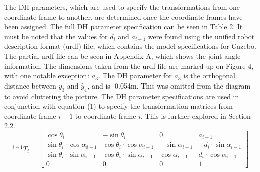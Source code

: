 \documentclass[a4paper]{article}
\begin{document}
The DH parameters, which are used to specify the transformations from one coordinate frame to another, are determined once the coordinate frames have been assigned. The full DH parameter specification can be seen in Table 2. It must be noted that the values for $d_i$ and $a_{i-1}$ were found using the unified robot description format (urdf) file, which contains the model specifications for Gazebo. The partial urdf file can be seen in Appendix A, which shows the joint angle information. The dimensions taken from the urdf file are marked up on Figure 4, with one notable exception: $a_3$. The DH parameter for $a_3$ is the orthogonal distance between $\hat{y}_3$ and $\hat{y}_4$, and is -0.054$\si{\meter}$. This was omitted from the diagram to avoid cluttering the picture. The DH parameter specifications are used in conjunction with equation (1) to specify the transformation matrices from coordinate frame $i-1$ to coordinate frame $i$. This is further explored in Section 2.2.\\

\begin{equation}
	^{i-1} T_i =
	\begin{bmatrix}
	\cos \theta_i 							& -\sin \theta_i  							& 0 					& a_{i-1}\\
	\sin \theta_i \cdot \cos \alpha_{i-1}	& \cos \theta_i \cdot \cos \alpha_{i-1}		& -\sin \alpha_{i-1} 	& -d_i \cdot \sin \alpha_{i-1}\\
	\sin \theta_i \cdot \sin \alpha_{i-1}	& \cos \theta_i \cdot \sin \alpha_{i-1}		& \cos \alpha_{i-1}		& d_i \cdot \cos \alpha_{i-1}\\
	0										& 0											& 0						& 1
	\end{bmatrix}
\end{equation}

\vspace{0.25cm}
\end{document}
